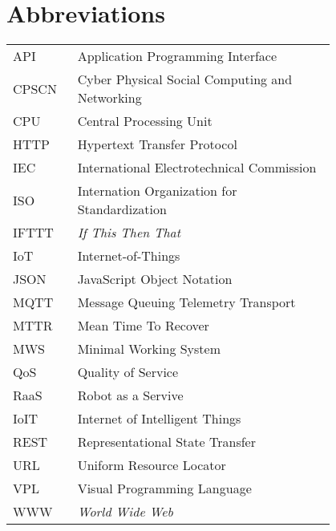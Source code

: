 \chapter*{Abbreviations}


\begin{flushleft}
\begin{tabular}{l p{0.8\linewidth}}
API      & Application Programming Interface\\
CPSCN    & Cyber Physical Social Computing and Networking\\
CPU      & Central Processing Unit\\
HTTP     & Hypertext Transfer Protocol\\
IEC      & International Electrotechnical Commission\\
ISO      & Internation Organization for Standardization\\
IFTTT    & \textit{If This Then That}\\
IoT      & Internet-of-Things\\
JSON     & JavaScript Object Notation\\
MQTT     & Message Queuing Telemetry Transport\\
MTTR     & Mean Time To Recover\\
MWS      & Minimal Working System\\
QoS      & Quality of Service\\
RaaS     & Robot as a Servive\\
IoIT     & Internet of Intelligent Things\\
REST     & Representational State Transfer\\
URL      & Uniform Resource Locator\\
VPL      & Visual Programming Language\\
WWW      & \textit{World Wide Web}\\
\end{tabular}
\end{flushleft}

